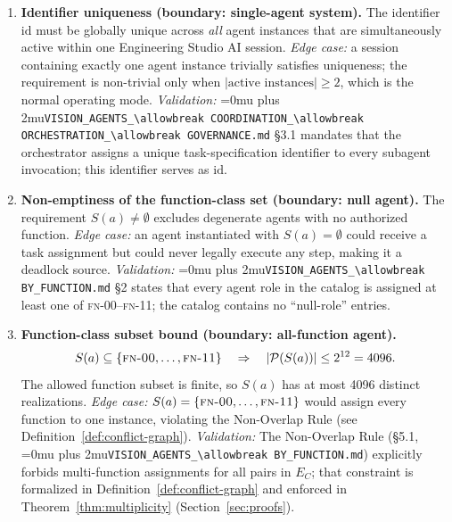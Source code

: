 \documentclass[12pt]{article}
\theoremstyle{definition}
\DeclareRobustCommand{\code}[1]{\begingroup\Urlmuskip=0mu plus 2mu\relax\nolinkurl{#1}\endgroup}
\newcommand{\FN}[1]{\textsc{fn-#1}}
\newcommand{\VisionGov}{\code{VISION\_AGENTS\_\allowbreak COORDINATION\_\allowbreak ORCHESTRATION\_\allowbreak GOVERNANCE.md}}
\newcommand{\VisionFunc}{\code{VISION\_AGENTS\_\allowbreak BY\_FUNCTION.md}}
\begin{document}
\begin{enumerate}[label=\textbf{A\arabic*.}, leftmargin=*, widest=A9]

  \item \textbf{Identifier uniqueness (boundary: single-agent system).}
        The identifier $\mathrm{id}$ must be globally unique across
        \emph{all} agent instances that are simultaneously active within
        one Engineering Studio AI session.
        \emph{Edge case:} a session containing exactly one agent instance
        trivially satisfies uniqueness; the requirement is non-trivial
        only when $\lvert\text{active instances}\rvert \geq 2$, which is
        the normal operating mode.
        \emph{Validation:} \VisionGov{} \S3.1 mandates that the
        orchestrator assigns a unique task-specification identifier to
        every subagent invocation; this identifier serves as $\mathrm{id}$.

  \item \textbf{Non-emptiness of the function-class set (boundary: null
        agent).}
        The requirement $S(a) \neq \emptyset$ excludes degenerate agents
        with no authorized function.
        \emph{Edge case:} an agent instantiated with $S(a) = \emptyset$
        could receive a task assignment but could never legally execute
        any step, making it a deadlock source.
        \emph{Validation:} \VisionFunc{} \S2 states that every agent role
        in the catalog is assigned at least one of \FN{00}--\FN{11};
        the catalog contains no ``null-role'' entries.

  \item \textbf{Function-class subset bound (boundary: all-function
        agent).}
                        \begin{equation*}
                              S(a) \subseteq \{\FN{00},\ldots,\FN{11}\}
                              \quad\Rightarrow\quad
                              |\mathcal{P}(S(a))| \le 2^{12} = 4096.
                        \end{equation*}
                        The allowed function subset is finite, so $S(a)$ has at most
                        4096 distinct realizations.
        \emph{Edge case:} $S(a) = \{\FN{00},\ldots,\FN{11}\}$ would
        assign every function to one instance, violating the Non-Overlap
        Rule (see Definition~\ref{def:conflict-graph}).
        \emph{Validation:} The Non-Overlap Rule (\S5.1, \VisionFunc{})
        explicitly forbids multi-function assignments for all pairs in
        $E_C$; that constraint is formalized in
        Definition~\ref{def:conflict-graph} and enforced in
        Theorem~\ref{thm:multiplicity} (Section~\ref{sec:proofs}).


\end{enumerate}
\end{document}

